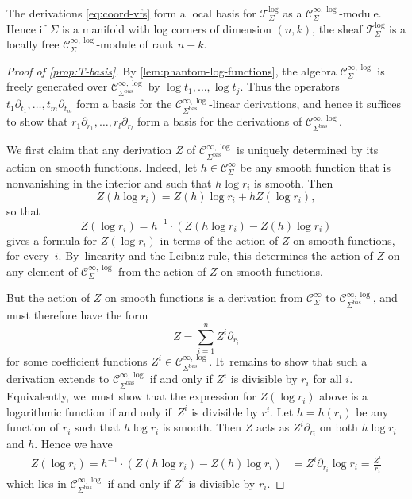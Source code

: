 \documentclass[JEP,XML,SOM,Unicode,NoFloatCountersInSection,published]{cedram}
\theoremstyle{definition}
\theoremstyle{remark}
\newcommand{\Cinf}[1]{\mathscr{C}^{\infty}_{#1}}
\newcommand{\Cinflog}[1]{\mathscr{C}^{\infty,\log}_{#1}}
\newcommand{\VFlog}[1]{\mathcal{T}^{\log}_{#1}}
\newcommand{\cvf}[1]{\partial_{#1}}
\newcommand{\logcvf}[1]{#1\partial_{#1}}
\newcommand{\Sig}{\Sigma}
\newcommand{\bas}[1]{{#1}^{\mathrm{bas}}}
\newcommand{\Sigbas}{\bas{\Sig}}
\begin{document}
\begin{proposition}\label{prop:T-basis}
The derivations \eqref{eq:coord-vfs} form a local basis for $\VFlog{\Sig}$ as a $\Cinflog{\Sig}$-module. Hence if $\Sig$ is a manifold with log corners of dimension $(n,k)$, the sheaf $\VFlog{\Sig}$ is a locally free $\Cinflog{\Sig}$-module of rank $n+k$.
\end{proposition}

\begin{proof}[Proof of \autoref{prop:T-basis}]
By \autoref{lem:phantom-log-functions}, the algebra $\Cinflog{\Sig}$ is freely generated over $\Cinflog{\Sigbas}$ by $\log t_1,\ldots,\log t_j$. Thus the operators $\logcvf{t_1},\ldots,\logcvf{t_m}$ form a basis for the $\Cinflog{\Sigbas}$-linear derivations, and hence it suffices to show that $\logcvf{r_1},\ldots,\logcvf{r_l}$ form a basis for the derivations of $\Cinflog{\Sigbas}$.

We first claim that any derivation $Z$ of $\Cinflog{\Sigbas}$ is uniquely determined by its action on smooth functions. Indeed, let $h \in \Cinf{\Sig}$ be any smooth function that is nonvanishing in the interior and such that $h \log r_i$ is smooth. Then
\[
Z(h \log r_i) = Z(h) \log r_i + h Z(\log r_i),
\]
so that
\[
Z(\log r_i) = h^{-1}\cdot (Z(h \log r_i) - Z(h)\log r_i)
\]
gives a formula for $Z(\log r_i)$ in terms of the action of $Z$ on smooth functions, for every~$i$. By~linearity and the Leibniz rule, this determines the action of $Z$ on any element of $\Cinflog{\Sig}$ from the action of $Z$ on smooth functions.

But the action of $Z$ on smooth functions is a derivation from $\Cinf{\Sig}$ to $\Cinflog{\Sigbas}$, and must therefore have the form
\[
Z = \sum_{i=1}^n Z^i \cvf{r_i}
\]
for some coefficient functions $Z^i\in \Cinflog{\Sigbas}$. It~remains to show that such a derivation extends to $\Cinflog{\Sigbas}$ if and only if $Z^i$ is divisible by $r_i$ for all $i$. Equivalently, we~must show that the expression for $Z(\log r_i)$ above is a logarithmic function if and only if~$Z^i$ is divisible by $r^i$. Let $h = h(r_i)$ be any function of $r_i$ such that $h\log r_i$ is smooth. Then $Z$ acts as $Z^i\cvf{r_i}$ on both $h \log r_i$ and $h$. Hence we have
\begin{align*}
Z(\log r_i) = h^{-1}\cdot (Z(h \log r_i) - Z(h)\log r_i) &= Z^i\cvf{r_i}\log r_i = \frac{Z^i}{r_i}
\end{align*}
which lies in $\Cinflog{\Sigbas}$ if and only if $Z^i$ is divisible by $r_i$.
\end{proof}
\end{document}

